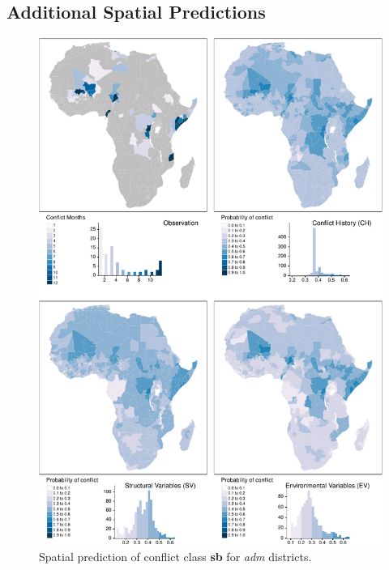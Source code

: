 \documentclass[a4paper,11pt]{article}
\begin{document}
\newpage
\begin{tiny}
\section*{Additional Spatial Predictions}


\begin{figure}[H]

{\centering \includegraphics{thesis_files/figure-latex/appendix-spatial-adm-sb-1} 

}

\caption[Spatial prediction of conflict class \textbf{sb} for \textit{adm} districts.]{Spatial prediction of conflict class \textbf{sb} for \textit{adm} districts.}\label{fig:appendix-spatial-adm-sb}
\end{figure}
\begin{figure}[H]


\end{figure}
\end{tiny}
\end{document}
